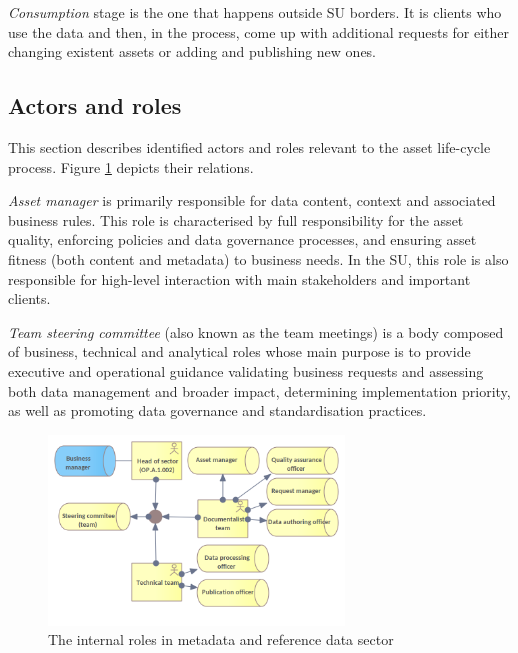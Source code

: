 	\textit{Consumption} stage is the one that happens outside SU borders. It is clients who use the data and then, in the process, come up with additional requests for either changing existent assets or adding and publishing new ones. 
	
	\subsection{Actors and roles}
	\label{sec:lifecycle-roles}	
	
	This section describes identified actors and roles relevant to the asset life-cycle process. Figure \ref{fig:internal-roles} depicts their relations.
		
	\textit{Asset manager} is primarily responsible for data content, context and associated business rules. This role is characterised by full responsibility for the asset quality, enforcing policies and data governance processes, and ensuring asset fitness (both content and metadata) to business needs. In the SU, this role is also responsible for high-level interaction with main stakeholders and important clients.
	
	\textit{Team steering committee} (also known as the team meetings) is a body composed of business, technical and analytical roles whose main purpose is to provide executive and operational guidance validating business requests and assessing both data management and broader impact, determining implementation priority, as well as promoting data governance and standardisation practices.
	
	
	\begin{figure}[h]
		\centering
		\includegraphics[width=0.7\textwidth]{images/business/Internal Roles.png}
		\caption{The internal roles in metadata and reference data sector}
		\label{fig:internal-roles}
	\end{figure}
	
